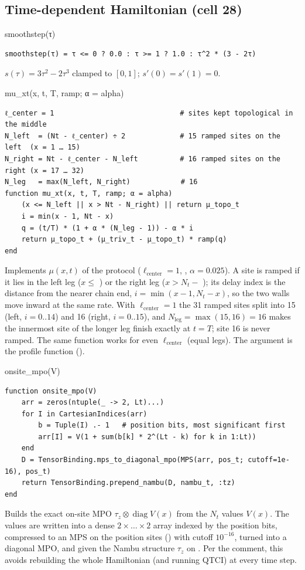 \documentclass[11pt]{article}
\begin{document}
\subsection{Time-dependent Hamiltonian (cell 28)}

\begin{function}{smoothstep(τ)}
\begin{Verbatim}
smoothstep(τ) = τ <= 0 ? 0.0 : τ >= 1 ? 1.0 : τ^2 * (3 - 2τ)
\end{Verbatim}
$s(\tau)=3\tau^2-2\tau^3$ clamped to $[0,1]$; $s'(0)=s'(1)=0$.
\end{function}

\begin{function}{mu\_xt(x, t, T, ramp; α = alpha)}
\begin{Verbatim}
ℓ_center = 1                              # sites kept topological in the middle
N_left  = (Nt - ℓ_center) ÷ 2             # 15 ramped sites on the left  (x = 1 … 15)
N_right = Nt - ℓ_center - N_left          # 16 ramped sites on the right (x = 17 … 32)
N_leg   = max(N_left, N_right)            # 16
function mu_xt(x, t, T, ramp; α = alpha)
    (x <= N_left || x > Nt - N_right) || return μ_topo_t
    i = min(x - 1, Nt - x)
    q = (t/T) * (1 + α * (N_leg - 1)) - α * i
    return μ_topo_t + (μ_triv_t - μ_topo_t) * ramp(q)
end
\end{Verbatim}
Implements $\mu(x,t)$ of the protocol ($\ell_{\text{center}}=1$, , $\alpha=0.025$). A site is ramped if it
lies in the left leg ($x\le$ ) or the right leg ($x>N_t-$ ); its delay index is the
distance from the nearer chain end, $i=\min(x-1,N_t-x)$, so the two walls move inward at the same rate. With
$\ell_{\text{center}}=1$ the 31 ramped sites split into 15 (left, $i=0..14$) and 16 (right, $i=0..15$), and
$N_{\text{leg}}=\max(15,16)=16$ makes the innermost site of the longer leg finish exactly at $t=T$; site 16 is never
ramped. The same function works for even $\ell_{\text{center}}$ (equal legs). The argument  is the profile
function ().
\end{function}

\begin{function}{onsite\_mpo(V)}
\begin{Verbatim}
function onsite_mpo(V)
    arr = zeros(ntuple(_ -> 2, Lt)...)
    for I in CartesianIndices(arr)
        b = Tuple(I) .- 1   # position bits, most significant first
        arr[I] = V(1 + sum(b[k] * 2^(Lt - k) for k in 1:Lt))
    end
    D = TensorBinding.mps_to_diagonal_mpo(MPS(arr, pos_t; cutoff=1e-16), pos_t)
    return TensorBinding.prepend_nambu(D, nambu_t, :tz)
end
\end{Verbatim}
Builds the exact on-site MPO $\tau_z\otimes\operatorname{diag}V(x)$ from the $N_t$ values $V(x)$. The values are
written into a dense $2\times\dots\times2$ array indexed by the position bits, compressed to an MPS on the position
sites () with cutoff $10^{-16}$, turned into a diagonal MPO, and given the Nambu structure
$\tau_z$ on . Per the comment, this avoids rebuilding the whole Hamiltonian (and running QTCI)
at every time step.
\end{function}
\end{document}
